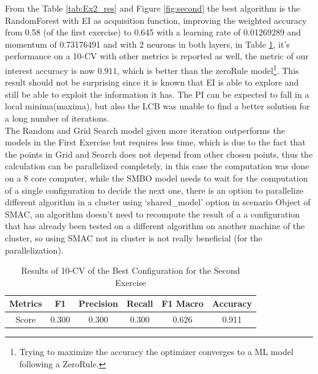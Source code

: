 \documentclass[12pt, onecolumn]{article}
\begin{document}
From the Table \ref{tab:Ex2_res} and Figure \ref{fig:second} the best algorithm is the RandomForest with EI as acquisition function, improving the weighted accuracy from 0.58 (of the first exercise) to 0.645 with a learning rate of 0.01269289 and momentum of 0.73176491 and with 2 neurons in both layers, in Table \ref{tab:best_2}, it's performance on a 10-CV with other metrics is reported as well, the metric of our interest accuracy is now $0.911$, which is better than the zeroRule model\footnote{Trying to maximize the accuracy the optimizer converges to a ML model following a ZeroRule.}.
This result should not be surprising since it is known that EI is able to explore and still be able to exploit the information it has.
The PI can be expected to fall in a local minima(maxima), but also the LCB was unable to find a better solution for a long number of iterations.\\
The Random and Grid Search model given more iteration outperforms the models in the First Exercise but requires less time, which is due to the fact that the points in Grid and Search does not depend from other chosen points, thus the calculation can be parallelized completely, in this case the computation was done on a 8 core computer, while the SMBO model needs to wait for the computation of a single configuration to decide the next one, there is an option to parallelize different algorithm in a cluster using `shared\_model' option in scenario Object of SMAC, an algorithm doesn't need to recompute the result of a a configuration that has already been tested on a different algorithm on another machine of the cluster, so using SMAC not in cluster is not really beneficial (for the parallelization). 
\begin{table}[!h]
  \centering
  \begin{tabular}{ |c|c|c|c|c|c| } 
    \hline
    Metrics& F1 & Precision & Recall & F1 Macro & Accuracy\\
    \hline
    Score& 0.300 & 0.300 & 0.300 & 0.626 & 0.911\\
    \hline
  \end{tabular}
  \caption{Results of 10-CV of the Best Configuration for the Second Exercise}
  \label{tab:best_2}
\end{table}
\end{document}
